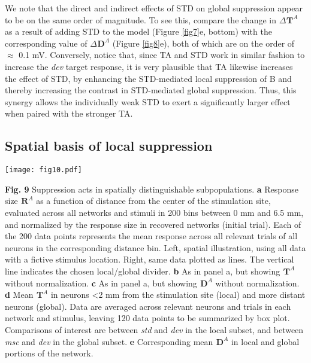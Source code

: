 \documentclass[pdflatex,referee,iicol,sn-basic]{sn-jnl}
\newcommand{\dev}{\textit{dev}}
\newcommand{\msc}{\textit{msc}}
\newcommand{\std}{\textit{std}}
\renewcommand{\R}[3][]{{}^{#1}_{}\mathbf{R}^{#2}_{#3}}
\renewcommand{\T}[3][]{{}^{#1}_{}\mathbf{T}^{#2}_{#3}}
\newcommand{\D}[3][]{{}^{#1}_{}\mathbf{D}^{#2}_{#3}}
\newcommand{\refpanel}[2]{Figure \ref{fig#1}\lowercase{#2}}
\begin{document}
We note that the direct and indirect effects of STD on global suppression appear to be on the same order of magnitude. To see this, compare the change in $\Delta \T{A}{}$ as a result of adding STD to the model (\refpanel{7}{e}, bottom) with the corresponding value of $\Delta \D{A}{}$ (\refpanel{8}{e}), both of which are on the order of $\approx$ 0.1 mV. Conversely, notice that, since TA and STD work in similar fashion to increase the \dev{} target response, it is very plausible that TA likewise increases the effect of STD, by enhancing the STD-mediated local suppression of B and thereby increasing the contrast in STD-mediated global suppression. Thus, this synergy allows the individually weak STD to exert a significantly larger effect when paired with the stronger TA.

\subsection{Spatial basis of local suppression}

\begin{figure*}%
    \centering
    \texttt{[image: fig10.pdf]}
    \caption{}
    \label{fig10}
\end{figure*}
\textbf{Fig. 9} Suppression acts in spatially distinguishable subpopulations.
\textbf{a} Response size $\R{A}{}$ as a function of distance from the center of the stimulation site, evaluated across all networks and stimuli in 200 bins between 0 mm and 6.5 mm, and normalized by the response size in recovered networks (initial trial). Each of the 200 data points represents the mean response across all relevant trials of all neurons in the corresponding distance bin. Left, spatial illustration, using all data with a fictive stimulus location. Right, same data plotted as lines. The vertical line indicates the chosen local/global divider.
\textbf{b} As in panel a, but showing $\T{A}{}$ without normalization.
\textbf{c} As in panel a, but showing $\D{A}{}$ without normalization.
\textbf{d} Mean $\T{A}{}$ in neurons <2 mm from the stimulation site (local) and more distant neurons (global). Data are averaged across relevant neurons and trials in each network and stimulus, leaving 120 data points to be summarized by box plot. Comparisons of interest are between \std{} and \dev{} in the local subset, and between \msc{} and \dev{} in the global subset.
\textbf{e} Corresponding mean $\D{A}{}$ in local and global portions of the network.
\end{document}
